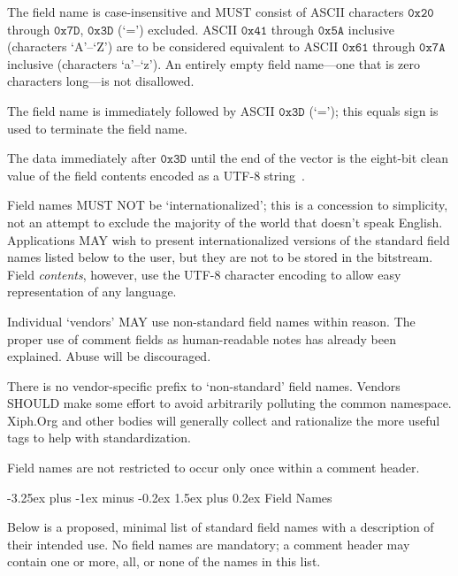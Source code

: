 \documentclass[9pt,letterpaper]{book}
\makeatletter
\newcommand{\hex}[1]{\ensuremath{\mathtt{0x#1}}}
\numberwithin{equation}{chapter}
\numberwithin{figure}{chapter}
\numberwithin{table}{chapter}
\renewcommand{\paragraph}{\@startsection{paragraph}{4}{0ex}%
 {-3.25ex plus -1ex minus -0.2ex}%
 {1.5ex plus 0.2ex}%
 {\normalfont\normalsize\bfseries}}
\makeatother
\begin{document}
The field name is case-insensitive and MUST consist of ASCII characters
 \hex{20} through \hex{7D}, \hex{3D} (`=') excluded.
ASCII \hex{41} through \hex{5A} inclusive (characters `A'--`Z') are to be
 considered equivalent to ASCII \hex{61} through \hex{7A} inclusive
 (characters `a'--`z').
An entirely empty field name---one that is zero characters long---is not
 disallowed.

The field name is immediately followed by ASCII \hex{3D} (`='); this equals
 sign is used to terminate the field name.

The data immediately after \hex{3D} until the end of the vector is the eight-bit
 clean value of the field contents encoded as a UTF-8 string~\cite{rfc2044}.

Field names MUST NOT be `internationalized'; this is a concession to
 simplicity, not an attempt to exclude the majority of the world that doesn't
 speak English.
Applications MAY wish to present internationalized versions of the standard
 field names listed below to the user, but they are not to be stored in the
 bitstream.
Field {\em contents}, however, use the UTF-8 character encoding to allow easy
 representation of any language.

Individual `vendors' MAY use non-standard field names within reason.
The proper use of comment fields as human-readable notes has already been
 explained.
Abuse will be discouraged.

There is no vendor-specific prefix to `non-standard' field names.
Vendors SHOULD make some effort to avoid arbitrarily polluting the common
 namespace.
Xiph.Org and other bodies will generally collect and rationalize the more 
 useful tags to help with standardization.

Field names are not restricted to occur only once within a comment header.

\paragraph{Field Names}


Below is a proposed, minimal list of standard field names with a description of
 their intended use.
No field names are mandatory; a comment header may contain one or more, all, or
 none of the names in this list.
\end{document}
